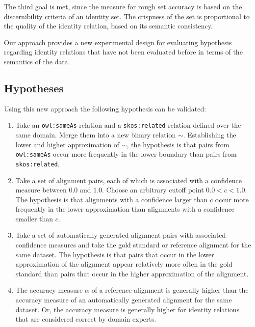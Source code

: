 \documentclass[letterpaper]{article}
\begin{document}
The third goal is met, since the measure for rough set accuracy
  is based on the discernibility criteria of an identity set.
The crispness of the set is proportional to the quality of the
  identity relation, based on its semantic consistency.

Our approach provides a new experimental design for evaluating
  hypothesis regarding identity relations that have not been
  evaluated before in terms of the semantics of the data.

\subsection{Hypotheses}
\label{sec:hypotheses}

Using this new approach the following hypothesis can be validated:

\begin{enumerate}
\item Take an \verb|owl:sameAs| relation and a \verb|skos:related|
        relation defined over the same domain.
      Merge them into a new binary relation $\sim$.
      Establishing the lower and higher approximation of $\sim$,
        the hypothesis is that pairs from \verb|owl:sameAs| occur more
        frequently in the lower boundary than pairs from \verb|skos:related|.
\item Take a set of alignment pairs, each of which is associated with
        a confidence measure between $0.0$ and $1.0$.
      Choose an arbitrary cutoff point $0.0<c<1.0$.
      The hypothesis is that alignments with a confidence larger than $c$
        occur more frequently in the lower approximation than alignments
        with a confidence smaller than $c$.
\item Take a set of automatically generated alignment pairs with
        associated confidence measures and take the gold standard or
        reference alignment for the same dataset.
      The hypothesis is that pairs that occur in the lower approximation
        of the alignment appear relatively more often in the gold standard
        than pairs that occur in the higher approximation of the alignment.
\item The accuracy measure $\alpha$ of a reference alignment is generally
        higher than the accuracy measure of an automatically generated
        alignment for the same dataset.
      Or, the accuracy measure is generally higher for identity relations
        that are considered correct by domain experts.
\end{enumerate}
\end{document}
